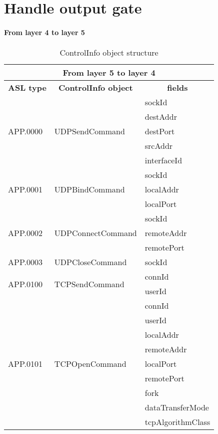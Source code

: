 \section{Handle output gate}




\newpage
\paragraph{From layer 4 to layer 5}
%
\begin{table}
\centering
\footnotesize
\caption{ControlInfo object structure}
\label{tab:from5-to4}
\ttfamily
\begin{tabular}{|l|l|l|}
\hline
\multicolumn{3}{|c|}{\normalfont\textbf{From layer 5 to layer 4}}	\\
\hline
\multicolumn{1}{|c|}{\normalfont\textbf{ASL type}}	&\multicolumn{1}{c|}{\normalfont\textbf{ControlInfo object}}		&\multicolumn{1}{c|}{\normalfont\textbf{fields}}\\
\hline
\multirow{5}{*}{APP.0000}	&\multirow{5}{*}{UDPSendCommand}	&sockId			\\
					&								&destAddr			\\
					&								&destPort			\\
					&								&srcAddr			\\
					&								&interfaceId		\\
\hline
\multirow{3}{*}{APP.0001}	&\multirow{3}{*}{UDPBindCommand}		&sockId			\\
					&								&localAddr		\\
					&								&localPort			\\
\hline
\multirow{3}{*}{APP.0002}	&\multirow{3}{*}{UDPConnectCommand}	&sockId			\\
					&								&remoteAddr		\\
					&								&remotePort		\\
\hline
APP.0003				&UDPCloseCommand				&sockId			\\
\hline
\multirow{2}{*}{APP.0100}	&\multirow{2}{*}{TCPSendCommand}	&connId			\\
					&								&userId			\\
\hline
\multirow{9}{*}{APP.0101}	&\multirow{9}{*}{TCPOpenCommand}	&connId			\\
					&								&userId			\\
					&								&localAddr		\\
					&								&remoteAddr		\\
					&								&localPort			\\
					&								&remotePort		\\
					&								&fork				\\
					&								&dataTransferMode	\\
					&								&tcpAlgorithmClass	\\
\hline
\end{tabular}
\end{table}



